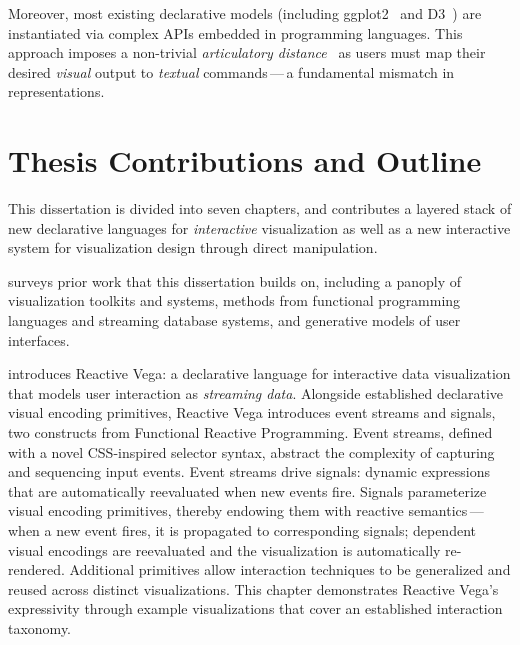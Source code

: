 Moreover, most existing declarative models (including
ggplot2~\cite{wickham:layered} and D3~\cite{bostock:d3}) are instantiated via
complex APIs embedded in programming languages. This approach imposes a
non-trivial \emph{articulatory distance}~\cite{hutchins:directmanip} as users
must map their desired \emph{visual} output to \emph{textual} commands\,---\,a
fundamental mismatch in representations.

\vspace{-10pt}

\section{Thesis Contributions and Outline}

This dissertation is divided into seven chapters, and contributes a layered
stack of new declarative languages for \emph{interactive} visualization as well
as a new interactive system for visualization design through direct
manipulation.

 surveys prior work that this dissertation builds on,
including a panoply of visualization toolkits and systems, methods from
functional programming languages and streaming database systems, and generative
models of user interfaces.

 introduces Reactive Vega: a declarative language for
interactive data visualization that models user interaction as \emph{streaming
data}. Alongside established declarative visual encoding primitives, Reactive
Vega introduces event streams and signals, two constructs from Functional
Reactive Programming. Event streams, defined with a novel CSS-inspired selector
syntax, abstract the complexity of capturing and sequencing input events. Event
streams drive signals: dynamic expressions that are automatically reevaluated
when new events fire. Signals parameterize visual encoding primitives, thereby
endowing them with reactive semantics\,---\,when a new event fires, it is
propagated to corresponding signals; dependent visual encodings are reevaluated
and the visualization is automatically re-rendered. Additional primitives allow
interaction techniques to be generalized and reused across distinct
visualizations. This chapter demonstrates Reactive Vega's expressivity through
example visualizations that cover an established interaction taxonomy.

